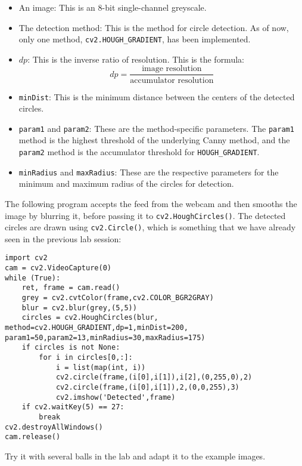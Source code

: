 \documentclass{labo}
\begin{document}
\begin{itemize}
	\item An image: This is an 8-bit single-channel greyscale. 

	\item The detection method: This is the method for circle detection. As of now, only one method, \texttt{cv2.HOUGH\_GRADIENT}, has been implemented. 

	\item $dp$: This is the inverse ratio of resolution. This is the formula:
	\[ dp = \frac{\text{image resolution}}{\text{accumulator resolution}} \]

	\item \texttt{minDist}: This is the minimum distance between the centers of the detected circles. 

	\item \texttt{param1} and \texttt{param2}: These are the method-specific parameters. The \texttt{param1} method is the highest threshold of the underlying Canny method, and the \texttt{param2} method is the accumulator threshold for \texttt{HOUGH\_GRADIENT}. 

	\item \texttt{minRadius} and \texttt{maxRadius}: These are the respective parameters for the minimum and maximum radius of the circles for detection.
\end{itemize}

The following program accepts the feed from the webcam and then smooths the image by blurring it, before passing it to \texttt{cv2.HoughCircles()}. The detected circles are drawn using \texttt{cv2.Circle()}, which is something that we have already seen in the previous lab session:

\begin{verbatim}
import cv2
cam = cv2.VideoCapture(0) 
while (True): 
	ret, frame = cam.read() 
	grey = cv2.cvtColor(frame,cv2.COLOR_BGR2GRAY) 
	blur = cv2.blur(grey,(5,5)) 
	circles = cv2.HoughCircles(blur, method=cv2.HOUGH_GRADIENT,dp=1,minDist=200, param1=50,param2=13,minRadius=30,maxRadius=175) 
	if circles is not None: 
		for i in circles[0,:]:
			i = list(map(int, i))
			cv2.circle(frame,(i[0],i[1]),i[2],(0,255,0),2) 
			cv2.circle(frame,(i[0],i[1]),2,(0,0,255),3) 
			cv2.imshow('Detected',frame) 
	if cv2.waitKey(5) == 27: 
		break 
cv2.destroyAllWindows() 
cam.release()
\end{verbatim}

\begin{leftbar}
Try it with several balls in the lab and adapt it to the example images.
\end{leftbar}
\end{document}
